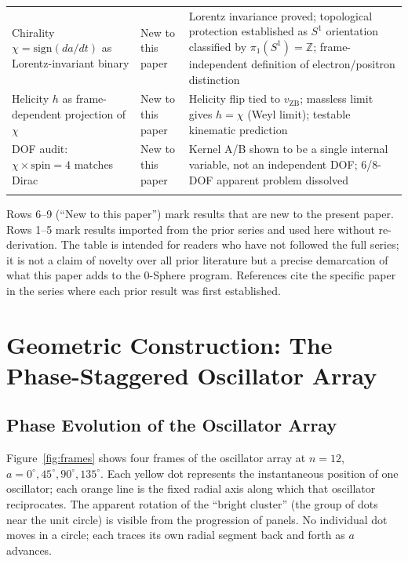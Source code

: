 \documentclass[%
 reprint, amsmath,amssymb, aps, prb, ]{revtex4-2}
\numberwithin{equation}{section}
\begin{document}
\begin{table}[t!]
\begin{tabular}{p{6.2cm}p{3.8cm}p{6.5cm}}
\addlinespace[0.3cm]
Chirality $\chi = \mathrm{sign}(da/dt)$ as Lorentz-invariant binary
& New to this paper
& Lorentz invariance proved; topological protection established as $S^1$ orientation classified by $\pi_1(S^1)=\mathbb{Z}$; frame-independent definition of electron/positron distinction \\
\addlinespace[0.3cm]
Helicity $h$ as frame-dependent projection of $\chi$
& New to this paper
& Helicity flip tied to $v_\mathrm{ZB}$; massless limit gives $h = \chi$ (Weyl limit); testable kinematic prediction \\
\addlinespace[0.3cm]
DOF audit: $\chi \times \mathrm{spin} = 4$ matches Dirac
& New to this paper
& Kernel A/B shown to be a single internal variable, not an independent DOF; 6/8-DOF apparent problem dissolved \\
\addlinespace[0.2cm]
\bottomrule
\end{tabular}
\vspace{0.2cm}
\begin{minipage}{0.95\textwidth}
\justifying\footnotesize
Rows 6--9 (``New to this paper'') mark results that are new to the present paper. Rows 1--5 mark results imported from the prior series and used here without re-derivation. The table is intended for readers who have not followed the full series; it is not a claim of novelty over all prior literature but a precise demarcation of what this paper adds to the 0-Sphere program. References cite the specific paper in the series where each prior result was first established.
\end{minipage}
\end{table}

\section{Geometric Construction: The Phase-Staggered Oscillator Array}
\label{sec:geometry}

\subsection{Phase Evolution of the Oscillator Array}

Figure~\ref{fig:frames} shows four frames of the oscillator array at $n = 12$, $a = 0^{\circ}, 45^{\circ}, 90^{\circ}, 135^{\circ}$.
Each yellow dot represents the instantaneous position of one oscillator; each orange line is the fixed radial axis along which that oscillator reciprocates.
The apparent rotation of the ``bright cluster'' (the group of dots near the unit circle) is visible from the progression of panels.
No individual dot moves in a circle; each traces its own radial segment back and forth as $a$ advances.
\end{document}
